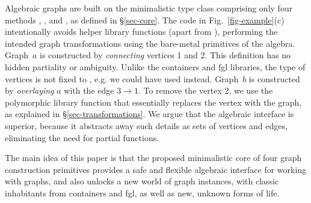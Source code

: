 Algebraic graphs are built on the minimalistic type class  comprising
only four methods , ,  and , as
defined in \S\ref{sec-core}. The code in
Fig.~\ref{fig-example}(c) intentionally avoids helper library functions (apart
from ), performing the intended graph transformations using the
bare-metal primitives of the algebra. Graph~$a$ is constructed by \emph{connecting}
vertices 1 and 2. This definition has no hidden partiality or ambiguity.
Unlike the \textsf{containers} and \textsf{fgl} libraries, the type of vertices
is not fixed to , e.g. we could have used  instead.
Graph~$b$ is constructed by \emph{overlaying} $a$ with the edge $3 \rightarrow 1$.
To remove the vertex 2, we use the polymorphic library function
 that essentially replaces the vertex with the  graph,
as explained in \S\ref{sec-transformations}. We argue that the algebraic
interface is superior, because it abstracts away such details as sets of
vertices and edges, eliminating the need for partial functions.

The main idea of this paper is that the proposed minimalistic core of four graph
construction primitives provides a safe and flexible algebraic interface
for working with graphs, and also unlocks a new world of graph instances, with
classic inhabitants from \textsf{containers} and \textsf{fgl}, as well
as new, unknown forms of life.
